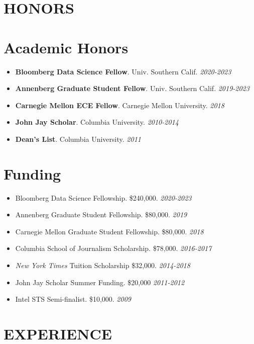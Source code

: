 \documentclass[margin]{res}
\newcommand{\fullhrulefill}{%
	\vspace{.7\baselineskip}
	\hspace*{-\sectionwidth}\hrulefill%
}
\begin{document}
\begin{resume}
\section{HONORS}
\fullhrulefill
\section{Academic Honors}
\begin{itemize}
	\item[] \textbf{Bloomberg Data Science Fellow}. Univ. Southern Calif. \hfill \textit{2020-2023}
	\item[] \textbf{Annenberg Graduate Student Fellow}. Univ. Southern Calif. \hfill \textit{2019-2023}
	\item[] \textbf{Carnegie Mellon ECE Fellow}. Carnegie Mellon University. \hfill \textit{2018}
	\item[] \textbf{John Jay Scholar}. Columbia University. \hfill \textit{2010-2014}
	\item[] \textbf{Dean's List}. Columbia University. \hfill \textit{2011}
\end{itemize}

\section{Funding}
\begin{itemize}
	\item[] Bloomberg Data Science Fellowship. \$240,000. \hfill \textit{2020-2023}
	\item[] Annenberg Graduate Student Fellowship. \$80,000. \hfill \textit{2019}
	\item[] Carnegie Mellon Graduate Student Fellowship. \$80,000. \hfill \textit{2018}
	\item[] Columbia School of Journalism  Scholarship. \$78,000. \hfill \textit{2016-2017}
	\item[] \textit{New York Times} Tuition Scholarship \$32,000. \hfill \textit{2014-2018}
	\item[] John Jay Scholar Summer Funding. \$20,000 \hfill \textit{2011-2012}
	\item[] Intel STS Semi-finalist. \$10,000. \hfill \textit{2009}
\end{itemize}

\section{EXPERIENCE}
\vspace{\baselineskip}
\fullhrulefill

\end{resume}
\end{document}
